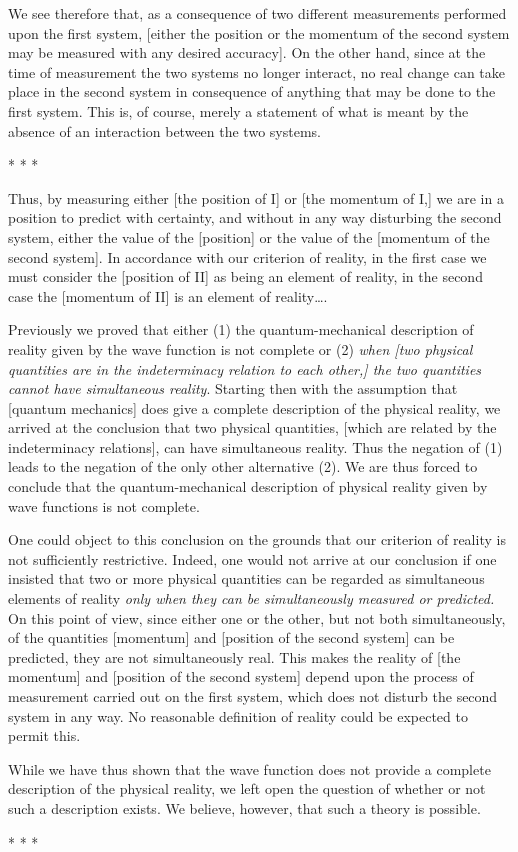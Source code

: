 We see therefore that, as a consequence of two different measurements
performed upon the first system, {[}either the position or the momentum
of the second system may be measured with any desired accuracy{]}. On
the other hand, since at the time of measurement the two systems no
longer interact, no real change can take place in the second system in
consequence of anything that may be done to the first system. This is,
of course, merely a statement of what is meant by the absence of an
interaction between the two systems.\\
\centerline{* * *}
%
Thus, by measuring either {[}the position of I{]} or {[}the momentum of
I,{]} we are in a position to predict with certainty, and without in any
way disturbing the second system, either the value of the {[}position{]}
or the value of the {[}momentum of the second system{]}. In accordance
with our criterion of reality, in the first case we must consider the
{[}position of II{]} as being an element of reality, in the second case
the {[}momentum of II{]} is an element of reality\ldots.

Previously we proved that either (1) the quantum-mechanical description
of reality given by the wave function is not complete or (2) \emph{when
{[}two physical quantities are in the indeterminacy relation to each
other,{]} the two quantities cannot have simultaneous reality}. Starting
then with the assumption that {[}quantum mechanics{]} does give a
complete description of the physical reality, we arrived at the
conclusion that two physical quantities, {[}which are related by the
indeterminacy relations{]}, can have simultaneous reality. Thus the
negation of (1) leads to the negation of the only other alternative (2).
We are thus forced to conclude that the quantum-mechanical description
of physical reality given by wave functions is not complete.

One could object to this conclusion on the grounds that our criterion of
reality is not sufficiently restrictive. Indeed, one would not arrive at
our conclusion if one insisted that two or more physical quantities can
be regarded as simultaneous elements of reality \emph{only when they can
be simultaneously measured or predicted.} On this point of view,
since either one or the other, but not both simultaneously, of the
quantities {[}momentum{]} and {[}position of the second system{]} can be
predicted, they are not simultaneously real. This makes the reality of
{[}the momentum{]} and {[}position of the second system{]} depend upon
the process of measurement carried out on the first system, which does
not disturb the second system in any way. No reasonable definition of
reality could be expected to permit this.

While we have thus shown that the wave function does not provide a
complete description of the physical reality, we left open the question
of whether or not such a description exists. We believe, however, that
such a theory is possible.\\
\centerline{* * *}
%